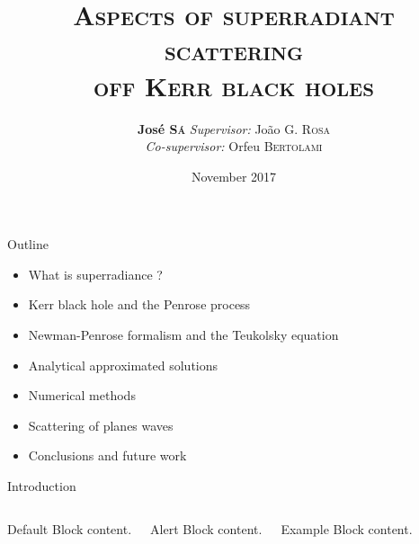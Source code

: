 \documentclass[9pt,serif,mathserif]{beamer}
\title{\scshape\LARGE Aspects of superradiant scattering \\ off Kerr black holes}
\date{November 2017}
\author{\textbf{José \textsc{Sá}} \hfill \textit{Supervisor:} João G. \textsc{Rosa} \\[0.15cm] \phantom{arg} \hfill \textit{Co-supervisor:} Orfeu \textsc{Bertolami} \\[0.4cm]}
\institute{Faculdade de Ciências da Universidade do Porto}
\begin{document}
\maketitle


\begin{frame}[fragile]{Outline}
    \begin{itemize}
        \large
        \setlength\itemsep{1.2em}
        \item What is superradiance ?
        \item Kerr black hole and the Penrose process
        \item Newman-Penrose formalism and the Teukolsky equation
        \item Analytical approximated solutions
        \item Numerical methods
        \item Scattering of planes waves 
        \item Conclusions and future work
    \end{itemize}
\end{frame}

{
    \begin{frame}[fragile]{Introduction}

        \begin{columns}[T,onlytextwidth]        
        
        
                \begin{block}{Default}
                Block content.
                \end{block}
        
                \begin{alertblock}{Alert}
                Block content.
                \end{alertblock}
        
                \begin{exampleblock}{Example}
                Block content.
                \end{exampleblock}
        
        \end{columns}

    \end{frame}
}
\end{document}

